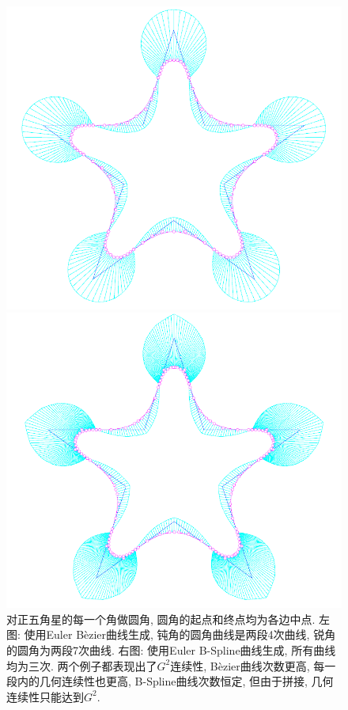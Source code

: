\documentclass[utf8]{ctexart} %
\begin{document}
	\begin{figure}[htbp]
		\centering
		\begin{minipage}{0.49\linewidth}
			\centering
			\includegraphics[width=0.9\linewidth]{figures/SmoothingCorner3.png}
		\end{minipage}
		\begin{minipage}{0.49\linewidth}
			\centering
			\includegraphics[width=0.9\linewidth]{figures/SmoothingCorner4.png}
		\end{minipage}
		\caption{\small{对正五角星的每一个角做圆角, 圆角的起点和终点均为各边中点. 左图: 使用Euler B\`ezier曲线生成, 钝角的圆角曲线是两段4次曲线, 锐角的圆角为两段7次曲线. 右图: 使用Euler B-Spline曲线生成, 所有曲线均为三次. 两个例子都表现出了$G^2$连续性, B\`ezier曲线次数更高, 每一段内的几何连续性也更高, B-Spline曲线次数恒定, 但由于拼接, 几何连续性只能达到$G^2$.}}
	\end{figure}
\end{document}
